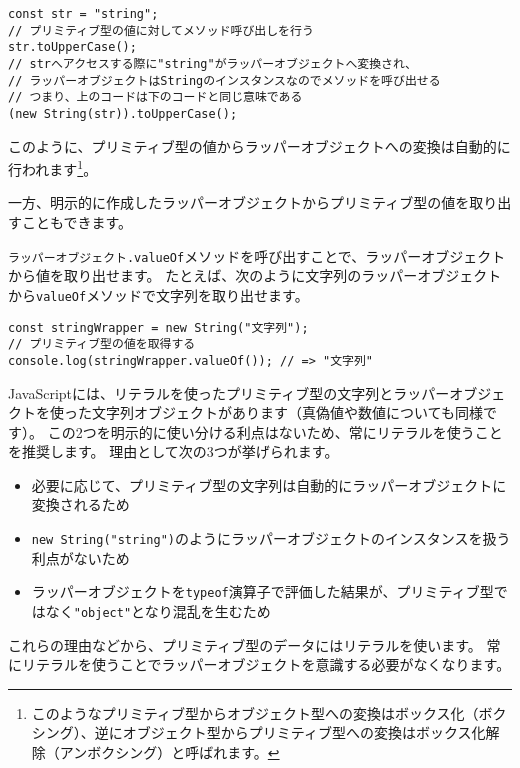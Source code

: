 \begin{lstlisting}
const str = "string";
// プリミティブ型の値に対してメソッド呼び出しを行う
str.toUpperCase();
// strへアクセスする際に"string"がラッパーオブジェクトへ変換され、
// ラッパーオブジェクトはStringのインスタンスなのでメソッドを呼び出せる
// つまり、上のコードは下のコードと同じ意味である
(new String(str)).toUpperCase();
\end{lstlisting}

このように、プリミティブ型の値からラッパーオブジェクトへの変換は自動的に行われます\footnote{このようなプリミティブ型からオブジェクト型への変換はボックス化（ボクシング）、逆にオブジェクト型からプリミティブ型への変換はボックス化解除（アンボクシング）と呼ばれます。}。

一方、明示的に作成したラッパーオブジェクトからプリミティブ型の値を取り出すこともできます。

\texttt{ラッパーオブジェクト.valueOf}メソッドを呼び出すことで、ラッパーオブジェクトから値を取り出せます。
たとえば、次のように文字列のラッパーオブジェクトから\texttt{valueOf}メソッドで文字列を取り出せます。

\begin{lstlisting}
const stringWrapper = new String("文字列");
// プリミティブ型の値を取得する
console.log(stringWrapper.valueOf()); // => "文字列"
\end{lstlisting}

JavaScriptには、リテラルを使ったプリミティブ型の文字列とラッパーオブジェクトを使った文字列オブジェクトがあります（真偽値や数値についても同様です）。
この2つを明示的に使い分ける利点はないため、常にリテラルを使うことを推奨します。
理由として次の3つが挙げられます。

\begin{itemize}
\item
  必要に応じて、プリミティブ型の文字列は自動的にラッパーオブジェクトに変換されるため
\item
  \texttt{new String("string")}のようにラッパーオブジェクトのインスタンスを扱う利点がないため
\item
  ラッパーオブジェクトを\texttt{typeof}演算子で評価した結果が、プリミティブ型ではなく\texttt{"object"}となり混乱を生むため
\end{itemize}

これらの理由などから、プリミティブ型のデータにはリテラルを使います。
常にリテラルを使うことでラッパーオブジェクトを意識する必要がなくなります。

